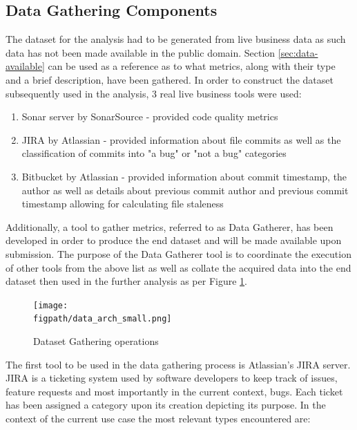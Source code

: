 \subsection{Data Gathering Components}
The dataset for the analysis had to be generated from live business data as such data has not been made available in the public domain. Section \ref{sec:data-available} can be used as a reference as to what metrics, along with their type and a brief description, have been gathered. In order to construct the dataset subsequently used in the analysis, 3 real live business tools were used:

\begin{enumerate}{\label{lst:tools_used}}
    \item Sonar server by SonarSource - provided code quality metrics
    \item JIRA by Atlassian  - provided information about file commits as well as the classification of commits into "a bug" or "not a bug" categories
    \item Bitbucket by Atlassian  - provided information about commit timestamp, the author as well as details about previous commit author and previous commit timestamp allowing for calculating file staleness 
\end{enumerate}
    
Additionally, a tool to gather metrics, referred to as Data Gatherer, has been developed in order to produce the end dataset and will be made available upon submission. The purpose of the Data Gatherer tool is to coordinate the execution of other tools from the above list as well as collate the acquired data into the end dataset then used in the further analysis as per Figure \ref{fig:data_gathering}.

\begin{figure}[h!]
\centering
    \texttt{[image: \\figpath/data\_arch\_small.png]}
    \caption{Dataset Gathering operations}
    \label{fig:data_gathering}
\end{figure}

The first tool to be used in the data gathering process is Atlassian's JIRA server. JIRA is a ticketing system used by software developers to keep track of issues, feature requests and most importantly in the current context, bugs. Each ticket has been assigned a category upon its creation depicting its purpose. In the context of the current use case the most relevant types encountered are:

